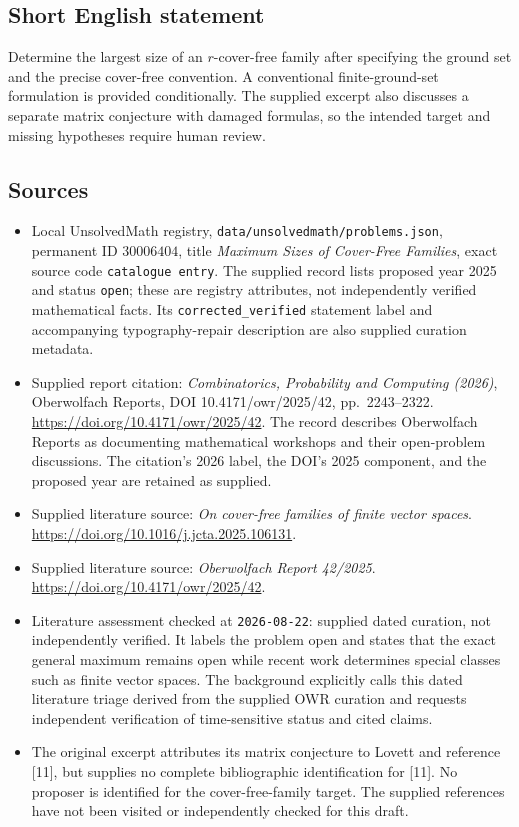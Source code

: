 \documentclass[11pt]{article}
\begin{document}
\subsection{Short English statement}
Determine the largest size of an \(r\)-cover-free family after specifying the ground set and the precise cover-free convention. A conventional finite-ground-set formulation is provided conditionally. The supplied excerpt also discusses a separate matrix conjecture with damaged formulas, so the intended target and missing hypotheses require human review.
\subsection{Sources}
\begin{itemize}
\item Local UnsolvedMath registry, \texttt{data/unsolvedmath/problems.json}, permanent ID \(30006404\), title \emph{Maximum Sizes of Cover-Free Families}, exact source code \texttt{catalogue entry}. The supplied record lists proposed year 2025 and status \texttt{open}; these are registry attributes, not independently verified mathematical facts. Its \texttt{corrected\_verified} statement label and accompanying typography-repair description are also supplied curation metadata.
\item Supplied report citation: \emph{Combinatorics, Probability and Computing (2026)}, Oberwolfach Reports, DOI 10.4171/owr/2025/42, pp.\ 2243--2322. \url{https://doi.org/10.4171/owr/2025/42}. The record describes Oberwolfach Reports as documenting mathematical workshops and their open-problem discussions. The citation's 2026 label, the DOI's 2025 component, and the proposed year are retained as supplied.
\item Supplied literature source: \emph{On cover-free families of finite vector spaces}. \url{https://doi.org/10.1016/j.jcta.2025.106131}.
\item Supplied literature source: \emph{Oberwolfach Report 42/2025}. \url{https://doi.org/10.4171/owr/2025/42}.
\item Literature assessment checked at \texttt{2026-08-22}: supplied dated curation, not independently verified. It labels the problem open and states that the exact general maximum remains open while recent work determines special classes such as finite vector spaces. The background explicitly calls this dated literature triage derived from the supplied OWR curation and requests independent verification of time-sensitive status and cited claims.
\item The original excerpt attributes its matrix conjecture to Lovett and reference [11], but supplies no complete bibliographic identification for [11]. No proposer is identified for the cover-free-family target. The supplied references have not been visited or independently checked for this draft.
\end{itemize}
\end{document}
